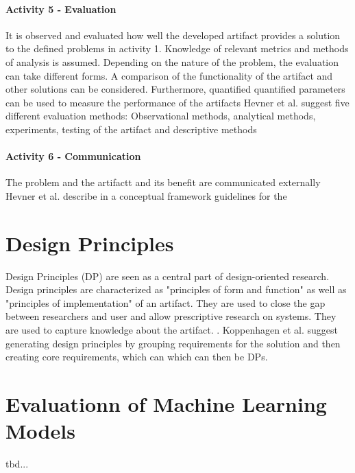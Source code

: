 \paragraph{Activity 5 - Evaluation} 
It is observed and evaluated how well the developed artifact provides a solution to the defined problems in activity 1.
Knowledge of relevant metrics and methods of analysis is assumed. Depending on the nature of the problem, the evaluation can take different forms.
A comparison of the functionality of the artifact and other solutions can be considered. Furthermore, quantified
quantified parameters can be used to measure the performance of the artifacts
\cite[p. 56]{peffers_designscienceresearch_2007}
Hevner et al.  suggest five different evaluation methods: Observational
methods, analytical methods, experiments, testing of the artifact and descriptive
methods 
\cite[p. 87]{hevner_designscienceinformation_2004}

\paragraph{Activity 6 - Communication} 
The problem and the artifactt and its benefit are communicated externally 
\cite[p. 56]{peffers_designscienceresearch_2007}
Hevner et al. describe in a conceptual framework guidelines for the

\section{Design Principles} 
Design Principles (DP) are seen as a central part of design-oriented research.
\cite[p. 348]{gregor_positioningpresentingdesign_2013}
Design principles are characterized as "principles of form and function" as well as "principles of implementation" of an artifact.
\cite[p.8]{gregor_anatomydesigntheory_}
They are used to close the gap between researchers and user and allow prescriptive research on systems. They are used to capture knowledge about the artifact. 
\cite[pp. 37-56]{sein_actiondesignresearch_2011}.
Koppenhagen et al. suggest generating design principles by grouping requirements for the solution and then creating core requirements, which can
which can then be DPs.
\cite[p. 6]{koppenhagen_designscienceresearch_2012}


\section{Evaluationn of Machine Learning Models }
tbd...

